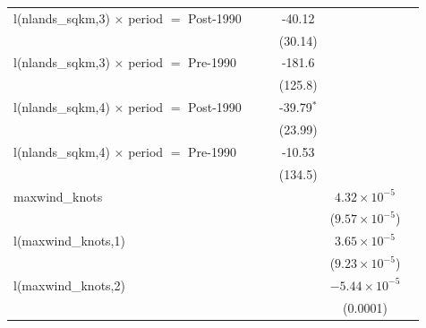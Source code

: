 \begin{tabular}{lccccc}
   l(nlands\_sqkm,3) $\times$ period $=$ Post-1990            &                &                         & -40.12         &                         &   \\   
                                                              &                &                         & (30.14)        &                         &   \\   
   l(nlands\_sqkm,3) $\times$ period $=$ Pre-1990             &                &                         & -181.6         &                         &   \\   
                                                              &                &                         & (125.8)        &                         &   \\   
   l(nlands\_sqkm,4) $\times$ period $=$ Post-1990            &                &                         & -39.79$^{*}$   &                         &   \\   
                                                              &                &                         & (23.99)        &                         &   \\   
   l(nlands\_sqkm,4) $\times$ period $=$ Pre-1990             &                &                         & -10.53         &                         &   \\   
                                                              &                &                         & (134.5)        &                         &   \\   
   maxwind\_knots                                             &                &                         &                & $4.32\times 10^{-5}$    &   \\   
                                                              &                &                         &                & ($9.57\times 10^{-5}$)  &   \\   
   l(maxwind\_knots,1)                                        &                &                         &                & $3.65\times 10^{-5}$    &   \\   
                                                              &                &                         &                & ($9.23\times 10^{-5}$)  &   \\   
   l(maxwind\_knots,2)                                        &                &                         &                & $-5.44\times 10^{-5}$   &   \\   
                                                              &                &                         &                & (0.0001)                &   \\   

\end{tabular}

